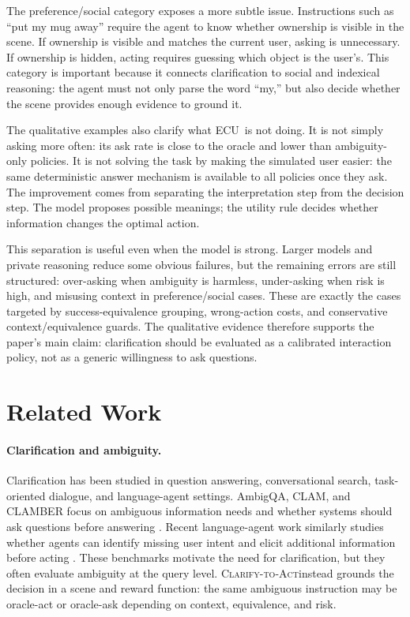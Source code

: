\documentclass{article} %
\newcommand{\task}{\textsc{Clarify-to-Act}}
\newcommand{\ecu}{\textsc{ECU}}
\begin{document}
The preference/social category exposes a more subtle issue. Instructions such as ``put my mug away'' require the agent to know whether ownership is visible in the scene. If ownership is visible and matches the current user, asking is unnecessary. If ownership is hidden, acting requires guessing which object is the user's. This category is important because it connects clarification to social and indexical reasoning: the agent must not only parse the word ``my,'' but also decide whether the scene provides enough evidence to ground it.

The qualitative examples also clarify what \ecu\ is not doing. It is not simply asking more often: its ask rate is close to the oracle and lower than ambiguity-only policies. It is not solving the task by making the simulated user easier: the same deterministic answer mechanism is available to all policies once they ask. The improvement comes from separating the interpretation step from the decision step. The model proposes possible meanings; the utility rule decides whether information changes the optimal action.

This separation is useful even when the model is strong. Larger models and private reasoning reduce some obvious failures, but the remaining errors are still structured: over-asking when ambiguity is harmless, under-asking when risk is high, and misusing context in preference/social cases. These are exactly the cases targeted by success-equivalence grouping, wrong-action costs, and conservative context/equivalence guards. The qualitative evidence therefore supports the paper's main claim: clarification should be evaluated as a calibrated interaction policy, not as a generic willingness to ask questions.

\section{Related Work}

\paragraph{Clarification and ambiguity.}
Clarification has been studied in question answering, conversational search, task-oriented dialogue, and language-agent settings. AmbigQA, CLAM, and CLAMBER focus on ambiguous information needs and whether systems should ask questions before answering \citep{min2020ambigqa,kuhn2022clam,zhang2024clamber}. Recent language-agent work similarly studies whether agents can identify missing user intent and elicit additional information before acting \citep{qian2024tell}. These benchmarks motivate the need for clarification, but they often evaluate ambiguity at the query level. \task instead grounds the decision in a scene and reward function: the same ambiguous instruction may be oracle-act or oracle-ask depending on context, equivalence, and risk.
\end{document}

